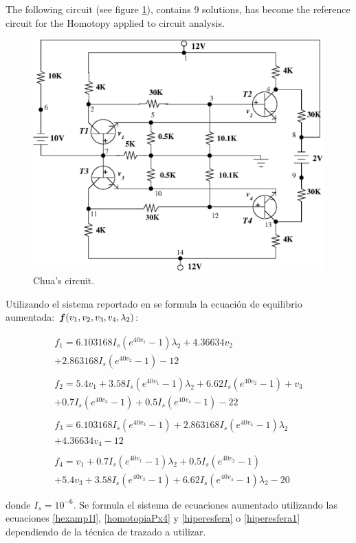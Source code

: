 \documentclass[conference,letterpaper,twocolumn]{IEEEtran}
\newcommand{\pig}[1]{\mbox{\boldmath ${#1}$}	}
\begin{document}
The following circuit \cite{homo_chua} (see figure \ref{newchua}), contains 9 solutions, has become the reference circuit for the Homotopy applied to circuit analysis. 

\begin{figure}[hbtp]
\centering
\includegraphics[scale=0.4]{fig/newchua.eps}
\caption{Chua's circuit.}
\label{newchua}
\end{figure}


Utilizando el sistema reportado en \cite{homo_chua} se formula la ecuación de equilibrio aumentada: $\pig{f}(v_1,v_2,v_3,v_4,\lambda_2)$:

{\scriptsize 
\begin{displaymath}
\begin{array}{l}
f_1= 6.103168I_s(e^{40v_1}-1)\lambda_2+4.36634v_2\\
+2.863168I_s(e^{40v_2}-1)-12\\\\
f_2=5.4v_1+3.58I_s(e^{40v_1}-1)\lambda_2+6.62I_s(e^{40v_2}-1)+v_3 \\
+0.7I_s(e^{40v_3}-1)+0.5I_s(e^{40v_4}-1)-22\\\\
f_3=6.103168I_s(e^{40v_3}-1)+2.863168I_s(e^{40v_4}-1)\lambda_2  \\
+4.36634v_4-12\\\\
f_4=v_1+0.7I_s(e^{40v_1}-1)\lambda_2+0.5I_s(e^{40v_2}-1) \\
+5.4v_3+3.58I_s(e^{40v_3}-1)+6.62I_s(e^{40v_4}-1)\lambda_2-20 \\\\
\end{array}
\end{displaymath}
}
donde $I_s=10^{-6}$. Se formula el sistema de ecuaciones aumentado utilizando las ecuaciones \ref{hexamp1l},  \ref{homotopiaPx4} 
y \ref{hiperesfera} o \ref{hiperesfera1} dependiendo de la técnica de trazado a utilizar.
\end{document}
